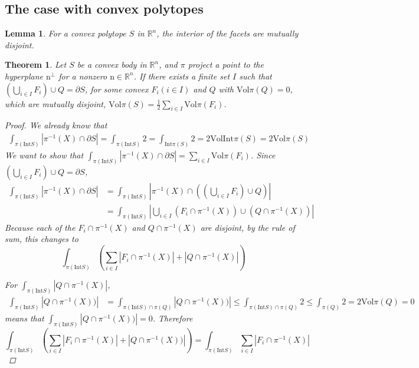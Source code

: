 \documentclass[a4paper]{article}
\newtheorem{thm}{Theorem}[subsection]
\newtheorem{lem}{Lemma}[subsection]
\theoremstyle{definition}
\begin{document}
\subsection{The case with convex polytopes}

\begin{lem} For a convex polytope $S$ in $\mathbb{R}^n$, the interior of the facets are mutually disjoint.
\end{lem}
\begin{thm} Let $S$ be a convex body in $\mathbb{R}^n$, and $\pi$ project a point to the hyperplane $\boldsymbol{\mathrm{n}}^{\perp}$ for a nonzero $\boldsymbol{\mathrm{n}}\in\mathbb{R}^n$. If there exists a finite set $I$ such that $(\bigcup_{i\in I}F_i)\cup Q=\partial S$, for some convex $F_i(i\in I)$ and $Q$ with $\mathrm{Vol}\pi(Q)=0$, which are mutually disjoint, $\mathrm{Vol}\pi(S)=\frac{1}{2}\sum_{i\in I} \mathrm{Vol}\pi(F_i)$.
\begin{proof}
We already know that\begin{equation}\begin{aligned}\int_{\pi(\mathrm{Int}S)}|\pi^{-1}(X)\cap\partial S|=\int_{\pi(\mathrm{Int}S)}2
=\int_{\mathrm{Int}\pi(S)}2
=2\mathrm{Vol}\mathrm{Int}\pi(S)
=2\mathrm{Vol}\pi(S)\end{aligned}\end{equation} We want to show that $\int_{\pi(\mathrm{Int}S)}|\pi^{-1}(X)\cap\partial S|=\sum_{i\in I} \mathrm{Vol}\pi(F_i)$. Since $(\bigcup_{i\in I}F_i)\cup Q=\partial S$, \begin{equation}\begin{aligned}\int_{\pi(\mathrm{Int}S)}|\pi^{-1}(X)\cap\partial S|&=\int_{\pi(\mathrm{Int}S)}|\pi^{-1}(X)\cap((\bigcup_{i\in I}F_i)\cup Q)|\\
&=\int_{\pi(\mathrm{Int}S)}|\bigcup_{i\in I}(F_i\cap \pi^{-1}(X))\cup (Q\cap \pi^{-1}(X))|\end{aligned}\end{equation} Because each of the $F_i\cap \pi^{-1}(X)$ and $Q\cap \pi^{-1}(X)$ are disjoint, by the rule of sum, this changes to \begin{equation}\int_{\pi(\mathrm{Int}S)}(\sum_{i\in I}|F_i\cap \pi^{-1}(X)|+ |Q\cap \pi^{-1}(X)|)\end{equation} 

For $\int_{\pi(\mathrm{Int}S)}|Q\cap \pi^{-1}(X)|$,\begin{equation}\begin{aligned}\int_{\pi(\mathrm{Int}S)}|Q\cap \pi^{-1}(X))|&=\int_{\pi(\mathrm{Int}S)\cap \pi(Q)}|Q\cap \pi^{-1}(X))|
\le\int_{\pi(\mathrm{Int}S)\cap \pi(Q)}2
\le\int_{\pi(Q)}2
=2\mathrm{Vol}\pi(Q)=0\end{aligned}\end{equation} means that $\int_{\pi(\mathrm{Int}S)}|Q\cap \pi^{-1}(X))|=0$. Therefore \begin{equation}\int_{\pi(\mathrm{Int}S)}(\sum_{i\in I}|F_i\cap \pi^{-1}(X)|+ |Q\cap \pi^{-1}(X))|)=\int_{\pi(\mathrm{Int}S)}\sum_{i\in I}|F_i\cap \pi^{-1}(X)|\end{equation}


\end{proof}
\end{thm}
\end{document}
